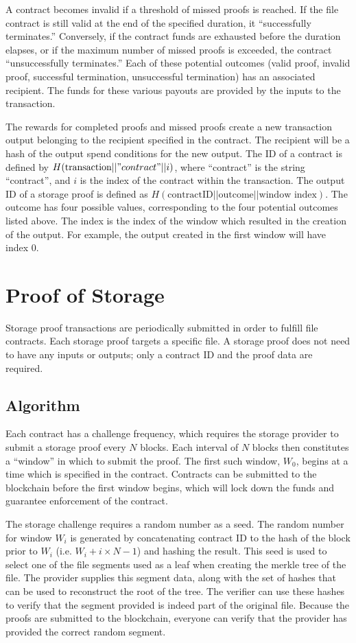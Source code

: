 \documentclass[twocolumn]{article}
\begin{document}
A contract becomes invalid if a threshold of missed proofs is reached.
If the file contract is still valid at the end of the specified duration, it ``successfully terminates.''
Conversely, if the contract funds are exhausted before the duration elapses, or if the maximum number of missed proofs is exceeded, the contract ``unsuccessfully terminates.''
Each of these potential outcomes (valid proof, invalid proof, successful termination, unsuccessful termination) has an associated recipient.
The funds for these various payouts are provided by the inputs to the transaction.

The rewards for completed proofs and missed proofs create a new transaction output belonging to the recipient specified in the contract.
The recipient will be a hash of the output spend conditions for the new output.
The ID of a contract is defined by $H(\text{transaction} || "contract" || i)$, where ``contract'' is the string ``contract'', and $i$ is the index of the contract within the transaction.
The output ID of a storage proof is defined as $H(\text{contractID} || \text{outcome} || \text{window index})$.
The outcome has four possible values, corresponding to the four potential outcomes listed above.
The index is the index of the window which resulted in the creation of the output.
For example, the output created in the first window will have index 0.

\section{Proof of Storage}
\label{sec:storage}
Storage proof transactions are periodically submitted in order to fulfill file contracts.
Each storage proof targets a specific file.
A storage proof does not need to have any inputs or outputs; only a contract ID and the proof data are required.

\subsection{Algorithm}
Each contract has a challenge frequency, which requires the storage provider to submit a storage proof every $N$ blocks.
Each interval of $N$ blocks then constitutes a ``window'' in which to submit the proof.
The first such window, $W_0$, begins at a time which is specified in the contract.
Contracts can be submitted to the blockchain before the first window begins, which will lock down the funds and guarantee enforcement of the contract.

The storage challenge requires a random number as a seed.
The random number for window $W_i$ is generated by concatenating contract ID to the hash of the block prior to $W_i$ (i.e. $W_i + i \times N - 1$) and hashing the result.
This seed is used to select one of the file segments used as a leaf when creating the merkle tree of the file.
The provider supplies this segment data, along with the set of hashes that can be used to reconstruct the root of the tree.
The verifier can use these hashes to verify that the segment provided is indeed part of the original file.
Because the proofs are submitted to the blockchain, everyone can verify that the provider has provided the correct random segment.
\end{document}
